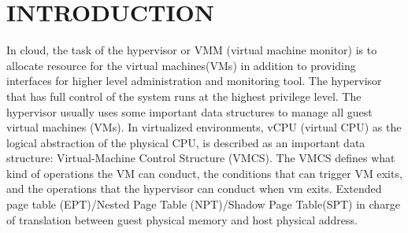 \documentclass[10pt, numbers, preprint ]{sigplanconf}
\begin{document}
{\section{INTRODUCTION}
\label{sec:introduction}%
In cloud, the task of the hypervisor or VMM (virtual machine monitor) is to allocate resource for the virtual machines(VMs) in addition to providing interfaces for higher level administration and monitoring tool\cite{perez2013characterizing}. The hypervisor that has full control of the system runs at the highest privilege level. The hypervisor usually uses some important data structures to manage all guest virtual machines (VMs). In virtualized environments, vCPU (virtual CPU) as the logical abstraction of the physical CPU, \cite{hai2011virtual} is described as an important data structure: Virtual-Machine Control Structure (VMCS). The VMCS defines what kind of operations the VM can conduct, the conditions that can trigger VM exits, and the operations that the hypervisor can conduct when vm exits. %
Extended page table (EPT)\cite{epturl}/Nested Page Table (NPT)\cite{mijat2011virtualization}/Shadow Page Table(SPT)\cite{shadowpturl} in charge of translation between guest physical memory and host physical address.

}
\end{document}
